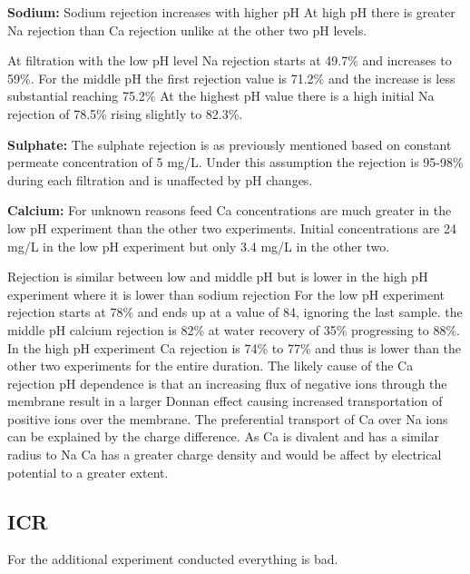 \textbf{Sodium:}
Sodium rejection increases with higher pH
At high pH there is greater Na rejection than Ca rejection unlike at the other two pH levels.

At filtration with the low pH level Na rejection starts at 49.7\% and increases to 59\%.
For the middle pH the first rejection value is 71.2\% and the increase is less substantial reaching 75.2\%
At the highest pH value there is a high initial Na rejection of 78.5\% rising slightly to 82.3\%.



\textbf{Sulphate:}
The sulphate rejection is as previously mentioned based on constant permeate concentration of 5 mg/L.
Under this assumption the rejection is 95-98\% during each filtration and is unaffected by pH changes.



\textbf{Calcium: }
For unknown reasons feed Ca concentrations are much greater in the low pH experiment than the other two experiments.
Initial concentrations are 24 mg/L in the low pH experiment but only 3.4 mg/L in the other two.

Rejection is similar between low and middle pH but is lower in the high pH experiment where it is lower than sodium rejection
For the low pH experiment rejection starts at 78\% and ends up at a value of 84, ignoring the last sample.
the middle pH calcium rejection is 82\% at water recovery of 35\% progressing to 88\%.
In the high pH experiment Ca rejection is 74\% to 77\% and thus is lower than the other two experiments for the entire duration.
The likely cause of the Ca rejection pH dependence is that an increasing flux of negative ions through the membrane result in a larger Donnan effect causing increased transportation of positive ions over the membrane.
The preferential transport of Ca over Na ions can be explained by the charge difference.
As Ca is divalent and has a similar radius to Na  Ca has a greater charge density and would be affect by electrical potential to a greater extent.

\subsection{ICR}
For the additional experiment conducted everything is bad.

